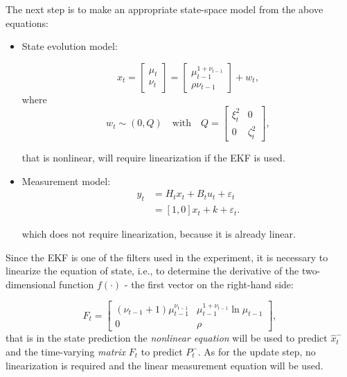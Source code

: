 The next step is to make an appropriate state-space model from the above equations:

\begin{itemize}
    \item State evolution model:

    \begin{equation}
        x_t = \begin{bmatrix} \mu_t \\ \nu_t \end{bmatrix}
        = 
        \begin{bmatrix} \mu_{t-1}^{1+\nu_{t-1}} \\ \rho\nu_{t-1} \end{bmatrix}
        + w_t,
   \end{equation}    
    where
    \begin{equation}
        w_t \sim (0, Q) \quad \text{with} \quad Q = \left[\begin{array}{cc}
            \xi_t^2 & 0 \\
            0 & \zeta_t^2
        \end{array}\right],
   \end{equation}

    \noindent that is nonlinear, will require linearization if the EKF is used.
    \item Measurement model:
    \begin{equation}
        \begin{aligned}
    y_t &= H_t x_t + B_t u_t + \varepsilon_t \\
    &= [1, 0]
    x_t + k + \varepsilon_t.
        \end{aligned}
        \label{eq:pgm_measurement_model}
    \end{equation}

    \noindent which does not require linearization, because it is already linear.
\end{itemize}

Since the EKF is one of the filters used in the experiment, it is necessary to linearize the equation of state, i.e., to determine the derivative of the two-dimensional function \(f\left(\cdot\right)\) - the first vector on the right-hand side:

\begin{equation}
F_t =
\begin{bmatrix}
(\nu_{t-1} + 1) \mu_{t-1}^{\nu_{t-1}} &
\mu_{t-1}^{1+\nu_{t-1}} \ln \mu_{t-1} \\
0 & \rho
\end{bmatrix},
\end{equation}
\noindent that is in the state prediction the \emph{nonlinear equation} will be used to predict \(\hat{x}_t^-\) and the time-varying \emph{matrix} \(F_t\) to predict \(P_t^-\). As for the update step, no linearization is required and the linear measurement equation will be used.

